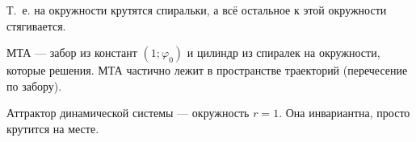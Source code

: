 Т.~е. на окружности крутятся спиральки, а всё остальное к этой окружности стягивается.

МТА --- забор из констант $(1;\varphi_0)$ и цилиндр из спиралек на окружности, которые решения.
МТА частично лежит в пространстве траекторий
(перечесение по забору).

Аттрактор динамической системы --- окружность $r = 1$.
Она инвариантна, просто крутится на месте.


